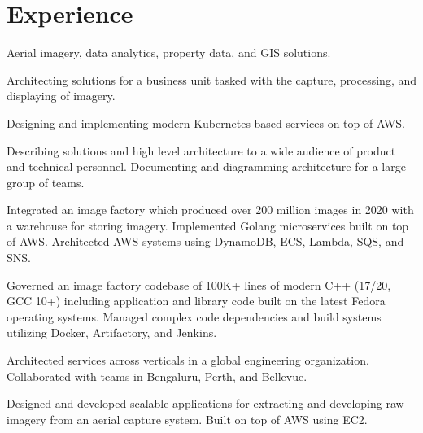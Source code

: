 \documentclass[letterpaper]{fowles-resume} %
\begin{document}
\begin{minipage}[t]{0.66\textwidth} %


\section{Experience}
Aerial imagery, data analytics, property data, and GIS solutions. 
\vspace{\topsep}
\begin{tightitemize}
\item Architecting solutions for a business unit tasked with the capture, processing, and displaying of imagery.
\item Designing and implementing modern Kubernetes based services on top of AWS.
\item Describing solutions and high level architecture to a wide audience of product and technical personnel. Documenting and diagramming architecture for a large group of teams. 
\end{tightitemize}
\begin{tightitemize}
\item Integrated an image factory which produced over 200 million images in 2020 with a warehouse for storing imagery. Implemented Golang microservices built on top of AWS. Architected AWS systems using DynamoDB, ECS, Lambda, SQS, and SNS.
\item Governed an image factory codebase of 100K+ lines of modern C++ (17/20, GCC 10+) including application and library code built on the latest Fedora operating systems. Managed complex code dependencies and build systems utilizing Docker, Artifactory, and Jenkins.
\item Architected services across verticals in a global engineering organization. Collaborated with teams in Bengaluru, Perth, and Bellevue.
\end{tightitemize}
\begin{tightitemize}
\item Designed and developed scalable applications for extracting and developing raw imagery from an aerial capture system. Built on top of AWS using EC2. 

\end{tightitemize}
\end{minipage}
\end{document}
